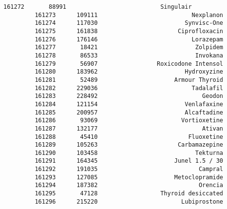 \documentclass[11pt]{article}
\begin{document}
\begin{Verbatim}[commandchars=\\\{\}]
         161272       88991                           Singulair   
         161273      109111                           Nexplanon   
         161274      117030                         Synvisc-One   
         161275      161838                       Ciprofloxacin   
         161276      176146                           Lorazepam   
         161277       18421                            Zolpidem   
         161278       86533                            Invokana   
         161279       56907                 Roxicodone Intensol   
         161280      183962                         Hydroxyzine   
         161281       52489                      Armour Thyroid   
         161282      229036                           Tadalafil   
         161283      228492                              Geodon   
         161284      121154                         Venlafaxine   
         161285      200957                         Alcaftadine   
         161286       93069                        Vortioxetine   
         161287      132177                              Ativan   
         161288       45410                          Fluoxetine   
         161289      105263                       Carbamazepine   
         161290      103458                            Tekturna   
         161291      164345                      Junel 1.5 / 30   
         161292      191035                             Campral   
         161293      127085                      Metoclopramide   
         161294      187382                             Orencia   
         161295       47128                  Thyroid desiccated   
         161296      215220                        Lubiprostone   
         

\end{Verbatim}
\end{document}
